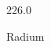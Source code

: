 \documentclass[12pt]{article}
\begin{document}
\hfill{}
\vfill
\begin{center}
  {\fontsize{50}{60}
  }

  \vspace{1em}

  226.0

Radium
\end{center}
\vfill
\end{document}
